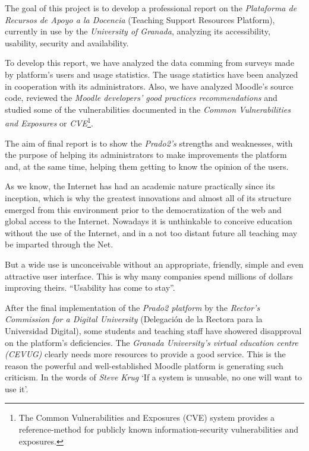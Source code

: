 {{The goal of this project is to develop a professional report on the \textit{Plataforma de Recursos de Apoyo a la Docencia} (Teaching Support Resources Platform), currently in use by the \textit{University of Granada}, analyzing its accessibility, usability, security and availability.

\bigskip
To develop this report, we have analyzed the data comming from surveys made by platform's users and usage statistics. The usage statistics have been analyzed in cooperation with its administrators. Also, we have analyzed Moodle's source code, reviewed the \textit{Moodle developers' good practices recommendations} and studied some of the vulnerabilities documented in the \textit{Common Vulnerabilities and Exposures} or \textit{CVE}\footnote{The Common Vulnerabilities and Exposures (CVE) system provides a reference-method for publicly known information-security vulnerabilities and exposures.}.

\bigskip
The aim of final report is to show the \textit{Prado2's} strengths and weaknesses, with the purpose of helping its administrators to make improvements the platform and, at the same time, helping them getting to know the opinion of the users.

\bigskip
As we know, the Internet has had an academic nature practically since its inception, which is why the greatest innovations and almost all of its structure emerged from this environment prior to the democratization of the web and global access to the Internet.  Nowadays it is unthinkable to conceive education without the use of the Internet, and in a not too distant future all teaching may be imparted through the Net. 

\bigskip
But a wide use is unconceivable without an appropriate, friendly, simple and even attractive user interface. This is why many companies spend millions of dollars improving theirs. ``Usability has come to stay''.\cite{jakonielsen} 

\bigskip
After the final implementation of the \textit{Prado2 platform} by the \textit{Rector’s Commission for a Digital University} (Delegación de la Rectora para la Universidad Digital), some students and teaching staff have showered disapproval on the platform’s deficiencies. The \textit{Granada University’s virtual education centre (CEVUG)} clearly needs more resources to provide a good service. This is the reason the powerful and well-established Moodle platform is  generating such criticism. In the words of \textit{Steve Krug} ‘If a system is unusable, no one will want to use it’\cite{stevekrug}.  

}}
